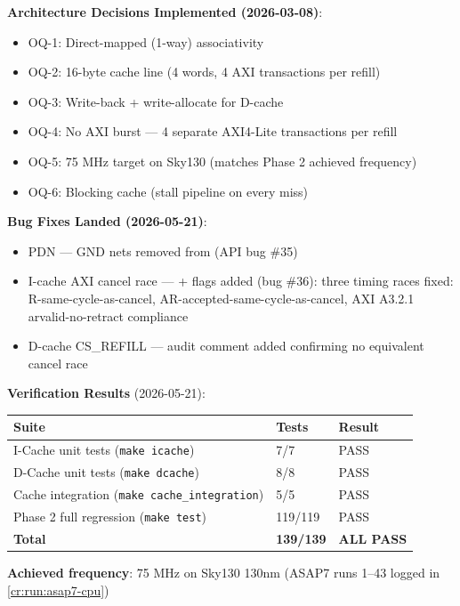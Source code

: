 \begin{record}
\textbf{Architecture Decisions Implemented (2026-03-08)}:

\begin{itemize}
\tightlist
\item
  OQ-1: \ok{} Direct-mapped (1-way) associativity
\item
  OQ-2: \ok{} 16-byte cache line (4 words, 4 AXI transactions per
  refill)
\item
  OQ-3: \ok{} Write-back + write-allocate for D-cache
\item
  OQ-4: \ok{} No AXI burst --- 4 separate AXI4-Lite transactions per
  refill
\item
  OQ-5: \ok{} 75 MHz target on Sky130 (matches Phase 2 achieved
  frequency)
\item
  OQ-6: \ok{} Blocking cache (stall pipeline on every miss)
\end{itemize}

\textbf{Bug Fixes Landed (2026-05-21)}:

\begin{itemize}
\tightlist
\item
  \ok{} PDN  --- GND nets removed from
   (API bug \#35)
\item
  \ok{} I-cache AXI cancel race ---  +
   flags added (bug \#36): three timing races
  fixed: R-same-cycle-as-cancel, AR-accepted-same-cycle-as-cancel, AXI
  A3.2.1 arvalid-no-retract compliance
\item
  \ok{} D-cache CS\_REFILL --- audit comment added confirming no
  equivalent cancel race
\end{itemize}

\textbf{Verification Results} (2026-05-21):

{
\begin{longtable}[]{@{}lll@{}}
\toprule\noalign{}
Suite & Tests & Result \\
\midrule\noalign{}
\endhead
\bottomrule\noalign{}
\endlastfoot
I-Cache unit tests (\texttt{make\ icache}) & 7/7 & \ok{} PASS \\
D-Cache unit tests (\texttt{make\ dcache}) & 8/8 & \ok{} PASS \\
Cache integration (\texttt{make\ cache\_\allowbreak{}integration}) & 5/5
& \ok{} PASS \\
Phase 2 full regression (\texttt{make\ test}) & 119/119 & \ok{} PASS \\
\textbf{Total} & \textbf{139/139} & \textbf{\ok{} ALL PASS} \\
\end{longtable}
}

\textbf{Achieved frequency}: 75 MHz on Sky130 130nm (ASAP7 runs 1--43
logged in \cref{cr:run:asap7-cpu})

\end{record}

